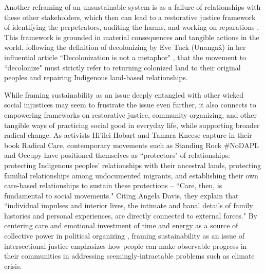 Another reframing of an 
unsustainable system is as a failure of relationships with these other stakeholders, which then can lead to a restorative justice framework of identifying the perpetrators, auditing the harms, and working on reparations \cite{whyte_indigenous_2017}.
This framework is grounded in material consequences and tangible actions in the world, following the definition of decolonizing by Eve Tuck (Unanga\^{x}) in her influential article ``Decolonization is not a metaphor" \cite{tuck_decolonization_2012}
, that the movement to ``decolonize"  must strictly refer to returning colonized land to their original peoples and repairing Indigenous land-based relationships.

While framing sustainability as an issue deeply entangled with other wicked social injustices may seem to frustrate the issue even further, it also connects to empowering frameworks on restorative justice, community organizing, and other tangible ways of practicing social good in everyday life, while supporting broader radical change. As activists Hi'ilei Hobart and Tamara Kneese capture in their book Radical Care, contemporary movements such as Standing Rock \#NoDAPL and Occupy have positioned themselves as ``protectors" of relationships: protecting Indigenous peoples' relationships with their ancestral lands, protecting familial relationships among undocumented migrants, and establishing their own care-based relationships to sustain these protections -- ``Care, then, is fundamental to social movements." \cite{hobart_radical_2020} Citing Angela Davis, they explain that ``individual impulses and interior lives, the intimate and banal details of family histories and personal experiences, are directly connected to external forces." By centering care and emotional investment of time and energy as a source of collective power in political organizing \cite{mcalevey_no_2016, sze_environmental_2020}, framing sustainability as an issue of intersectional justice emphasizes how people can make observable progress in their communities in addressing seemingly-intractable problems such as climate crisis.

